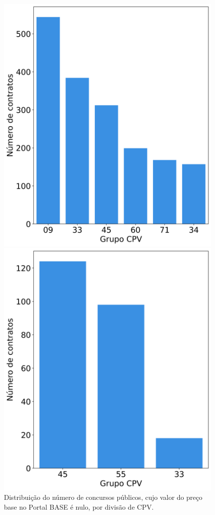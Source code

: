 \begin{figure}[h]
	\begin{minipage}{.33\textwidth}
		\centering
		\includegraphics[width=1\linewidth]{imagens/r31/pb.png}
		\caption{Distribuição do número de concursos públicos, cujo valor do preço base no Portal BASE é nulo, por divisão de CPV.}
		\label{fig:r31nulos}
	\end{minipage}
	\begin{minipage}{.33\textwidth}
		\centering
		\includegraphics[width=1\linewidth]{imagens/r31/pcpb.png}

\end{minipage}
\end{figure}
